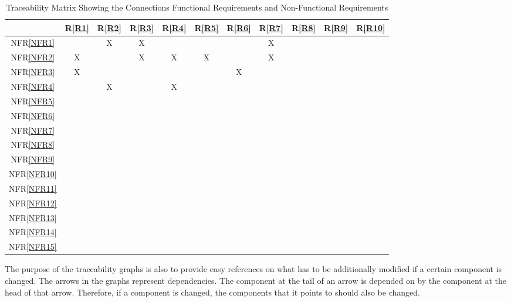 \documentclass[12pt]{article}
\newcommand{\frref}[1]{R\ref{#1}}
\newcommand{\nfrref}[1]{NFR\ref{#1}}
\begin{document}
\begin{table}[h!]
\centering
\begin{tabular}{|c|c|c|c|c|c|c|c|c|c|c|}
\hline
	& \frref{R1}& \frref{R2}& \frref{R3}& \frref{R4}& \frref{R5}& \frref{R6}& \frref{R7} &\frref{R8} &\frref{R9}& \frref{R10} \\
\hline                    %
\nfrref{NFR1}         &   & X& X&   &   &   & X&   &   &\\ \hline
\nfrref{NFR2}         & X&   & X& X&  X&   & X&   &   & \\ \hline
\nfrref{NFR3}         & X&   &   &   &   & X&   &   &   & \\ \hline
\nfrref{NFR4}         &   & X&   & X&   &   &   &   &   & \\ \hline
\nfrref{NFR5}         &   &   &   &   &   &   &   &   &   & \\ \hline
\nfrref{NFR6}         &   &   &   &   &   &   &   &   &   & \\ \hline
\nfrref{NFR7}         &   &   &   &   &   &   &   &   &   & \\ \hline
\nfrref{NFR8}         &   &   &   &   &   &   &   &   &   & \\ \hline
\nfrref{NFR9}         &   &   &   &   &   &   &   &   &   & \\ \hline 
\nfrref{NFR10}       &   &   &   &   &   &   &   &   &   & \\ \hline
\nfrref{NFR11}       &   &   &   &   &   &   &   &   &   & \\ \hline
\nfrref{NFR12}       &   &   &   &   &   &   &   &   &   & \\ \hline
\nfrref{NFR13}       &   &   &   &   &   &   &   &   &   & \\ \hline
\nfrref{NFR14}       &   &   &   &   &   &   &   &   &   & \\ \hline
\nfrref{NFR15}       &   &   &   &   &   &   &   &   &   & \\ 
\hline
\end{tabular}
\caption{Traceability Matrix Showing the Connections Functional Requirements and Non-Functional Requirements}
\label{Table:R_trace}

\end{table}

The purpose of the traceability graphs is also to provide easy references on
what has to be additionally modified if a certain component is changed.  The
arrows in the graphs represent dependencies. The component at the tail of an
arrow is depended on by the component at the head of that arrow. Therefore, if a
component is changed, the components that it points to should also be
changed. 
\end{document}
